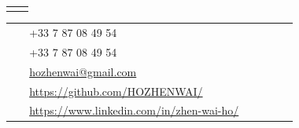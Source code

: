 \documentclass[10pt]{article} %
\begin{document}
\begin{paracol}{2}
\begin{supertabular}{rl}
	
	
	\tableentry{}{}{} %
	
	

	
	
\end{supertabular}

\medskip %


\switchcolumn %


\parbox[top][0.12\textheight][c]{\linewidth}{ %
	\vspace{-0.04\textheight} %
	\colorbox{shade}{ %
		\begin{supertabular}{p{0.05\linewidth}|p{0.775\linewidth}} %
			\raisebox{-1pt}{\faPhone} & +33 7 87 08 49 54 \\ %
			\raisebox{-1pt}{\faWechat} & +33 7 87 08 49 54 \\
			\raisebox{0pt}{\small\faEnvelope} & \href{mailto:hozhenwai@gmail.com}{hozhenwai@gmail.com} \\ %
			\raisebox{-1pt}{\faGithub} & \href{https://github.com/HOZHENWAI/}{https://github.com/HOZHENWAI/} \\ %
			\raisebox{-1pt}{\faLinkedinSquare} & \href{https://www.linkedin.com/in/zhen-wai-ho/}{https://www.linkedin.com/in/zhen-wai-ho/} \\ %
		\end{supertabular}
	}
}



\end{paracol}
\end{document}
